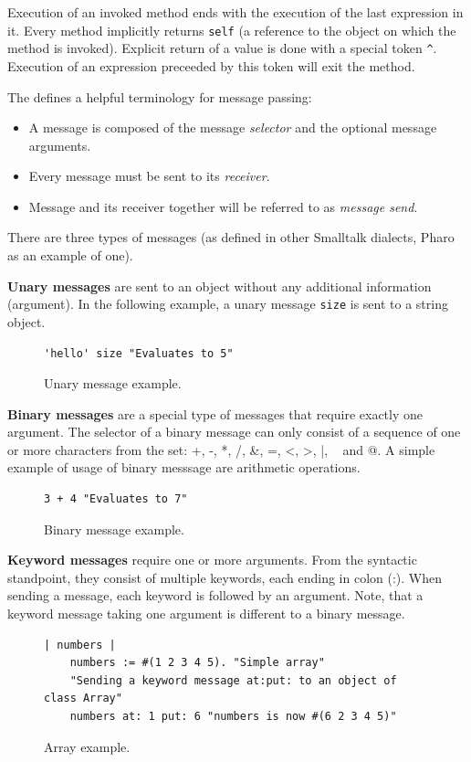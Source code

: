 \documentclass[thesis=M,english]{FITthesis}[2019/12/23]
\begin{document}
Execution of an invoked method ends with the execution of the last expression in it. Every method implicitly
returns \texttt{self} (a reference to the object on which the method is invoked). Explicit return of a value
is done with a special token \texttt{\^}. Execution of an expression preceeded by this token will exit the method.

The \cite{pharo-by-example} defines a helpful terminology for message passing:
\begin{itemize}
	\item A message is composed of the message \textit{selector} and the optional message arguments.
	\item Every message must be sent to its \textit{receiver}.
	\item Message and its receiver together will be referred to as \textit{message send}.
\end{itemize}

There are three types of messages (as defined in other Smalltalk dialects, Pharo as an example of one).

\textbf{Unary messages} are sent to an object without any additional information (argument). In the following
example, a unary message \texttt{size} is sent to a string object.
\begin{figure}[h!]
\begin{lstlisting}[language=Smalltalk]
	'hello' size "Evaluates to 5"
\end{lstlisting}
\caption{Unary message example.}
\end{figure}

\textbf{Binary messages} are a special type of messages that require exactly one argument. The selector
of a binary message can only consist of a sequence of one or more characters from the set: +, -, *, /,
\&, =, \textless, \textgreater, |, ~ and @. A simple example of usage of binary messsage are arithmetic operations.
\begin{figure}[h!]
\begin{lstlisting}[language=Smalltalk]
	3 + 4 "Evaluates to 7"
\end{lstlisting}
\caption{Binary message example.}
\end{figure}

\textbf{Keyword messages} require one or more arguments. From the syntactic standpoint, they consist of
multiple keywords, each ending in colon (:). When sending a message, each keyword is followed by an argument.
Note, that a keyword message taking one argument is different to a binary message.
\begin{figure}[h!]
\begin{lstlisting}[language=Smalltalk]
	| numbers |
	numbers := #(1 2 3 4 5). "Simple array"
	"Sending a keyword message at:put: to an object of class Array"
	numbers at: 1 put: 6 "numbers is now #(6 2 3 4 5)"
\end{lstlisting}
\caption{Array example.}
\end{figure}
\end{document}
